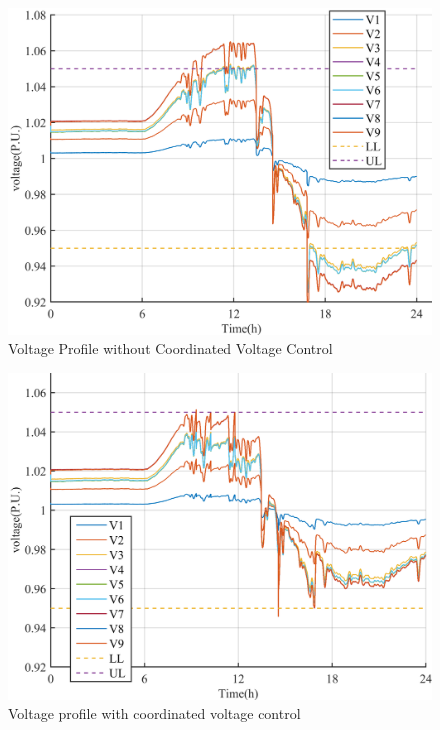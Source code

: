 \begin{figure}[!htb]
\centering
\includegraphics[width=\linewidth]{figs/NEW_WITHOUT_VVC.png}
\caption{Voltage Profile without Coordinated Voltage Control}
\label{fig:without_vvc}
\end{figure}

\begin{figure}[!htb]
\centering
\includegraphics[width=\linewidth]{figs/NEW_WITH_VVC.png}
\caption{Voltage profile with coordinated voltage control}
\label{fig:with_cvc}
\end{figure}


